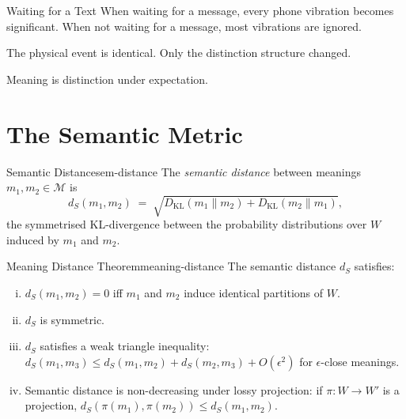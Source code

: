 \documentclass[12pt,twoside,openright]{book}
\begin{document}
\begin{distinctionaside}{Waiting for a Text}
When waiting for a message, every phone vibration becomes
significant. When not waiting for a message, most vibrations
are ignored.

The physical event is identical. Only the distinction
structure changed.

Meaning is distinction under expectation.
\end{distinctionaside}

\section{The Semantic Metric}

\begin{definition}{Semantic Distance}{sem-distance}
  The \emph{semantic distance} between meanings
  $m_1, m_2 \in \mathcal{M}$ is
  \[
    d_S(m_1, m_2)
    \;=\;
    \sqrt{
      D_\mathrm{KL}(m_1 \| m_2)
      + D_\mathrm{KL}(m_2 \| m_1)
    },
  \]
  the symmetrised KL-divergence between the
  probability distributions over $W$ induced by
  $m_1$ and $m_2$.
\end{definition}

\begin{theorem}{Meaning Distance Theorem}{meaning-distance}
  The semantic distance $d_S$ satisfies:
  \begin{enumerate}[(i)]
    \item $d_S(m_1, m_2) = 0$ iff $m_1$ and $m_2$
          induce identical partitions of $W$.
    \item $d_S$ is symmetric.
    \item $d_S$ satisfies a weak triangle inequality:
          $d_S(m_1, m_3) \le d_S(m_1, m_2)
          + d_S(m_2, m_3) + O(\epsilon^2)$ for
          $\epsilon$-close meanings.
    \item Semantic distance is non-decreasing under
          lossy projection: if $\pi: W \to W'$ is a
          projection, $d_S(\pi(m_1), \pi(m_2))
          \le d_S(m_1, m_2)$.
  \end{enumerate}
\end{theorem}
\end{document}
